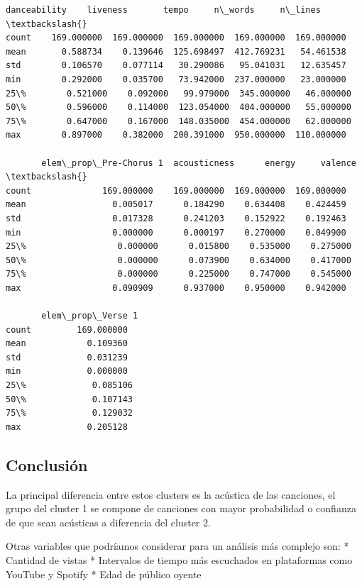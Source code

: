 \documentclass[11pt]{article}
\makeatletter
\newcommand{\boxspacing}{\kern\kvtcb@left@rule\kern\kvtcb@boxsep}
\newcommand{\prompt}[4]{
        {\ttfamily\llap{{\color{#2}[#3]:\hspace{3pt}#4}}\vspace{-\baselineskip}}
    }
\makeatother
\begin{document}
            \begin{tcolorbox}[breakable, size=fbox, boxrule=.5pt, pad at break*=1mm, opacityfill=0]
\prompt{Out}{outcolor}{129}{\boxspacing}
\begin{Verbatim}[commandchars=\\\{\}]
       danceability    liveness       tempo     n\_words     n\_lines  \textbackslash{}
count    169.000000  169.000000  169.000000  169.000000  169.000000
mean       0.588734    0.139646  125.698497  412.769231   54.461538
std        0.106570    0.077114   30.290086   95.041031   12.635457
min        0.292000    0.035700   73.942000  237.000000   23.000000
25\%        0.521000    0.092000   99.979000  345.000000   46.000000
50\%        0.596000    0.114000  123.054000  404.000000   55.000000
75\%        0.647000    0.167000  148.035000  454.000000   62.000000
max        0.897000    0.382000  200.391000  950.000000  110.000000

       elem\_prop\_Pre-Chorus 1  acousticness      energy     valence  \textbackslash{}
count              169.000000    169.000000  169.000000  169.000000
mean                 0.005017      0.184290    0.634408    0.424459
std                  0.017328      0.241203    0.152922    0.192463
min                  0.000000      0.000197    0.270000    0.049900
25\%                  0.000000      0.015800    0.535000    0.275000
50\%                  0.000000      0.073900    0.634000    0.417000
75\%                  0.000000      0.225000    0.747000    0.545000
max                  0.090909      0.937000    0.950000    0.942000

       elem\_prop\_Verse 1
count         169.000000
mean            0.109360
std             0.031239
min             0.000000
25\%             0.085106
50\%             0.107143
75\%             0.129032
max             0.205128
\end{Verbatim}
\end{tcolorbox}
        
    \hypertarget{conclusiuxf3n}{%
\subsection{Conclusión}\label{conclusiuxf3n}}

La principal diferencia entre estos clusters es la acústica de las
canciones, el grupo del cluster 1 se compone de canciones con mayor
probabilidad o confianza de que sean acústicas a diferencia del cluster
2.

Otras variables que podríamos considerar para un análisis más complejo
son: * Cantidad de vistas * Intervalos de tiempo más escuchados en
plataformas como YouTube y Spotify * Edad de público oyente
\end{document}
